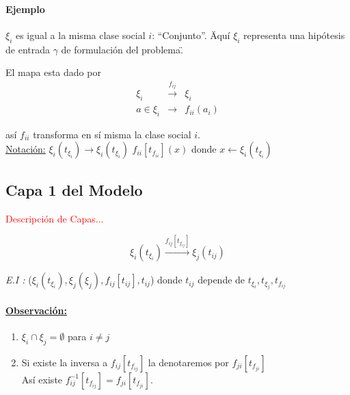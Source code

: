 \documentclass[]{article}
\begin{document}
\paragraph{Ejemplo}
$\xi_i$ es igual a la misma clase social $i$: ``Conjunto''. \"Aqu\'i  $\xi_i$ representa una hip\'otesis de entrada $\gamma$ de formulaci\'on del problema\".

El mapa esta dado por
\begin{eqnarray}
\xi_i & \overset{f_{i j }}{\longrightarrow} & \xi_i  \\
a \in \xi_{i} & \longrightarrow & f_{ii}\left(a_{i}\right)
\end{eqnarray}

as\'i $f_{ii}$ transforma  en s\'i misma la  clase social $i$. \\
\underline{Notaci\'on:}\hspace{0.2cm} $\displaystyle \xi_i(t_{\xi_{i}}) \longrightarrow \xi_i(t_{\xi_{i}})$ \hspace{0.5cm} $\displaystyle f_{ii}[t_{f_{ii}}]\left( x\right) $\hspace{0.2cm}  donde \hspace{0.2cm} $x\leftarrow\xi_i(t_{\xi_i})$

\subsection{Capa 1 del Modelo}
\textcolor{red}{Descripci\'on de Capas...}

\begin{equation}
\xi_i(t_{\xi_i}) \xrightarrow[ ]{f_{ij}\left[ t_{f_{ij}} \right]} \xi_j(t_{ij})
\end{equation}

\emph{E.I :} ($\xi_i(t_{\xi_i}), \xi_j(\xi_j), f_{ij}[t_{ij}], t_{ij}$)  donde 
$t_{ij}$ depende de $t_{\xi_i},  t_{\xi_j},  t_{f_{ij}}$


\paragraph{\underline{Observaci\'on:}}
\begin{enumerate}
	\item $\xi_i \cap \xi_j = \emptyset$ \hspace{0.5cm} para \hspace{0.5cm}  $i\neq j$
	\item Si existe la inversa a $f_{ij}[t_{f_{ij}}]$ la denotaremos por $f_{ji}[t_{f_{ji}}]$\\
	As\'i existe $f^{-1}_{ij}[t_{f_{ij}}]=f_{ji}[t_{f_{ji}}]$.
\end{enumerate}
\end{document}

